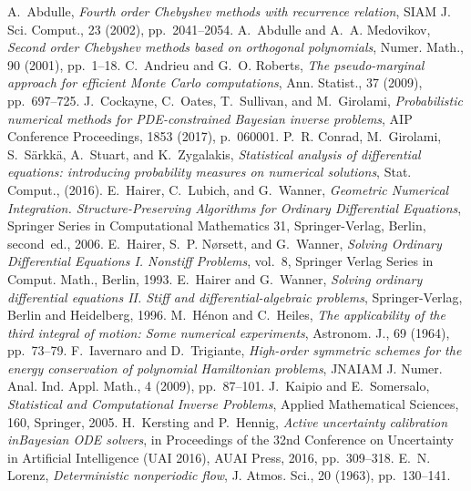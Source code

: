 \documentclass{siamart1116}
\numberwithin{theorem}{section}
\begin{document}
{\def\cprime{$'$}
\begin{thebibliography}{10}
	{\sc A.~Abdulle}, {\em Fourth order {C}hebyshev methods with recurrence
		relation}, SIAM J. Sci. Comput., 23 (2002), pp.~2041--2054.
	{\sc A.~Abdulle and A.~A. Medovikov}, {\em Second order {C}hebyshev methods
		based on orthogonal polynomials}, Numer. Math., 90 (2001), pp.~1--18.
	{\sc C.~Andrieu and G.~O. Roberts}, {\em The pseudo-marginal approach for
		efficient {M}onte {C}arlo computations}, Ann. Statist., 37 (2009),
	pp.~697--725.
	{\sc J.~Cockayne, C.~Oates, T.~Sullivan, and M.~Girolami}, {\em Probabilistic
		numerical methods for {PDE}-constrained {B}ayesian inverse problems}, AIP
	Conference Proceedings, 1853 (2017), p.~060001.
	{\sc P.~R. Conrad, M.~Girolami, S.~S{\"a}rkk{\"a}, A.~Stuart, and
		K.~Zygalakis}, {\em Statistical analysis of differential equations:
		introducing probability measures on numerical solutions}, Stat. Comput.,
	(2016).
	{\sc E.~Hairer, C.~Lubich, and G.~Wanner}, {\em Geometric Numerical
		Integration. Structure-Preserving Algorithms for Ordinary Differential
		Equations}, Springer Series in Computational Mathematics 31, Springer-Verlag,
	Berlin, second~ed., 2006.
	{\sc E.~Hairer, S.~P. N{\o{}}rsett, and G.~Wanner}, {\em Solving Ordinary
		Differential Equations I. Nonstiff Problems}, vol.~8, Springer Verlag Series
	in Comput. Math., Berlin, 1993.
	{\sc E.~Hairer and G.~Wanner}, {\em Solving ordinary differential equations II.
		Stiff and differential-algebraic problems}, Springer-Verlag, Berlin and
	Heidelberg, 1996.
	{\sc M.~H\'enon and C.~Heiles}, {\em The applicability of the third integral of
		motion: {S}ome numerical experiments}, Astronom. J., 69 (1964), pp.~73--79.
	{\sc F.~Iavernaro and D.~Trigiante}, {\em High-order symmetric schemes for the
		energy conservation of polynomial {H}amiltonian problems}, JNAIAM J. Numer.
	Anal. Ind. Appl. Math., 4 (2009), pp.~87--101.
	{\sc J.~Kaipio and E.~Somersalo}, {\em Statistical and Computational Inverse
		Problems}, Applied Mathematical Sciences, 160, Springer, 2005.
	{\sc H.~Kersting and P.~Hennig}, {\em Active uncertainty calibration in{B}ayesian {ODE} solvers}, in Proceedings of the 32nd Conference on
	Uncertainty in Artificial Intelligence (UAI 2016), {AUAI} Press, 2016,
	pp.~309--318.
	{\sc E.~N. Lorenz}, {\em Deterministic nonperiodic flow}, J. Atmos. Sci., 20
	(1963), pp.~130--141.

\end{thebibliography}}
\end{document}
